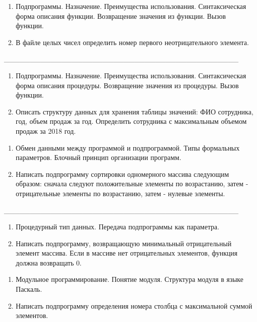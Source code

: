\documentclass[oneside, final, 14pt]{extreport}
\newcommand{\cutline}{\_\_\_\_\_\_\_\_\_\_\_\_\_\_\_\_\_\_\_\_\_\_\_\_\_\_\_\_\_\_\_\_\_\_\_\_\_\_\_\_\_\_\_\_\_}
\begin{document}
\newpage


\begin{enumerate}
\item Подпрограммы. Назначение. Преимущества использования.
Синтаксическая форма описания функции. Возвращение значения из функции. Вызов функции.
\item В файле целых чисел определить номер первого неотрицательного элемента.
\end{enumerate}


\cutline


\begin{enumerate}
\item Подпрограммы. Назначение. Преимущества использования. Синтаксическая форма описания процедуры. Возвращение значения из процедуры. Вызов функции.
\item Описать структуру данных для хранения таблицы значений: ФИО сотрудника, год, объем продаж за год. Определить сотрудника с максимальным объемом продаж за 2018 год.
\end{enumerate}


\newpage


\begin{enumerate}
\item Обмен данными между программой и подпрограммой. Типы формальных параметров.
Блочный принцип организации программ.
\item Написать подпрограмму сортировки одномерного массива следующим образом: сначала следуют 
 положительные элементы по возрастанию, затем - отрицательные элементы по возрастанию, 
 затем - нулевые элементы.
\end{enumerate}


\cutline


\begin{enumerate}
\item Процедурный тип данных. Передача подпрограммы как параметра.
\item Написать подпрограмму, возвращающую минимальный отрицательный элемент массива. Если 
в массиве нет отрицательных элементов, функция должна возвращать 0.
\end{enumerate}


\newpage


\begin{enumerate}
\item Модульное программирование. Понятие модуля. Структура модуля в языке Паскаль.
\item Написать подпрограмму определения номера столбца с максимальной суммой элементов.
\end{enumerate}

\end{document}
